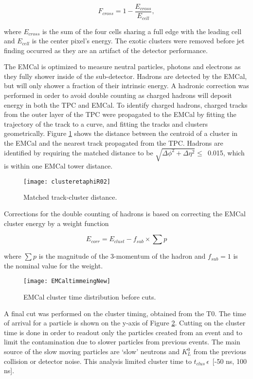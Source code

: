 \begin{equation}
F_{cross} = 1 - \frac{ E_{cross} }{ E_{cell} },
\label{eq:Fcross}
\end{equation}

\noindent
where $E_{cross}$ is the sum of the four cells sharing a full edge with the leading cell and $E_{cell}$ is the center pixel's energy.  The exotic clusters were removed before jet finding occurred as they are an artifact of the detector performance.

The EMCal is optimized to measure neutral particles, photons and electrons as they fully shower inside of the sub-detector.  Hadrons are detected by the EMCal, but will only shower a fraction of their intrinsic energy.  A hadronic correction was performed in order to avoid double counting as charged hadrons will deposit energy in both the TPC and EMCal.  To identify charged hadrons, charged tracks from the outer layer of the TPC were propagated to the EMCal by fitting the trajectory of the track to a curve, and fitting the tracks and clusters geometrically.  Figure \ref{fig:EMChadetaphi} shows the distance between the centroid of a cluster in the EMCal and the nearest track propagated from the TPC.  Hadrons are identified by requiring the matched distance to be $\sqrt{ \Delta\phi^{2} + \Delta\eta^{2} } \leq \,$ 0.015, which is within one EMCal tower distance.

\begin{figure}[h]
\texttt{[image: clusteretaphiR02]}
\centering
\caption{Matched track-cluster distance.}
\label{fig:EMChadetaphi}
\end{figure}


Corrections for the double counting of hadrons is based on correcting the EMCal cluster energy by a weight function

\begin{equation}
E_{corr} = E_{clust} - f_{sub} \times \sum p
\label{eq:HadCorr}
\end{equation}

\noindent
where $\sum p$ is the magnitude of the 3-momentum of the hadron and $f_{sub} = 1$ is the nominal value for the weight.

\begin{figure}[!h]
\texttt{[image: EMCaltimmeingNew]}
\centering
\caption{EMCal cluster time distribution before cuts.}
\label{fig:EMCaltime}
\end{figure}

A final cut was performed on the cluster timing, obtained from the T0.  The time of arrival for a particle is shown on the y-axis of Figure \ref{fig:EMCaltime}.  Cutting on the cluster time is done in order to readout only the particles created from an event and to limit the contamination due to slower particles from previous events.  The main source of the slow moving particles are `slow' neutrons and $K_{L}^{0}$ from the previous collision or detector noise.  This analysis limited cluster time to $t_{clus} \, \epsilon \,$ [-50 ns, 100 ns].

